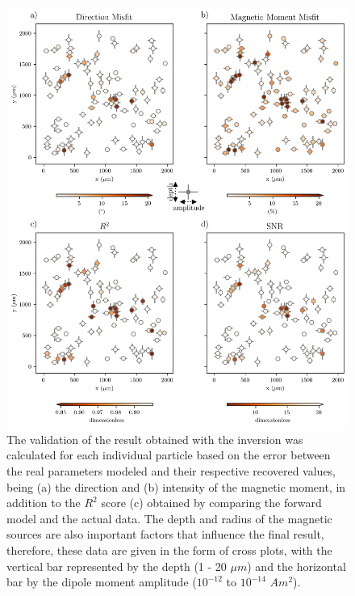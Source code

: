 \begin{figure}[htbp!]
\centering
\includegraphics[width=0.75\linewidth]{figures/complex-synthetic-comparison.png}
\caption{
The validation of the result obtained with the inversion was calculated for each individual particle based on the error between the real parameters modeled and their respective recovered values, being (a) the direction and (b) intensity of the magnetic moment, in addition to the $R^2$ score (c) obtained by comparing the forward model and the actual data. The depth and radius of the magnetic sources are also important factors that influence the final result, therefore, these data are given in the form of cross plots, with the vertical bar represented by the depth (1 - 20 $\mu m$) and the horizontal bar by the dipole moment amplitude ($10^{-12}$ to $10^{-14}$ $Am^2$).
}
\label{complex-synthetic-comparison}
\end{figure}

